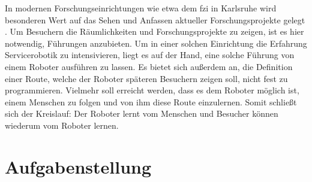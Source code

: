 In modernen Forschungseinrichtungen wie etwa dem \gls{fzi} in Karlsruhe wird besonderen Wert auf das Sehen und Anfassen aktueller Forschungsprojekte gelegt \cite{fziHoLL}.
Um Besuchern die Räumlichkeiten und Forschungsprojekte zu zeigen, ist es hier notwendig, Führungen anzubieten.
Um in einer solchen Einrichtung die Erfahrung Servicerobotik zu intensivieren, liegt es auf der Hand, eine solche Führung von einem Roboter ausführen zu lassen.
Es bietet sich außerdem an, die Definition einer Route, welche der Roboter späteren Besuchern zeigen soll, nicht fest zu programmieren.
Vielmehr soll erreicht werden, dass es dem Roboter möglich ist, einem Menschen zu folgen und von ihm diese Route einzulernen.
Somit schließt sich der Kreislauf:
Der Roboter lernt vom Menschen und Besucher können wiederum vom Roboter lernen.

 
%
% 

\section{Aufgabenstellung}
\label{einleitung_aufgabenstellung_sec}
\authorsection{\editorjulian, \editortobias}

